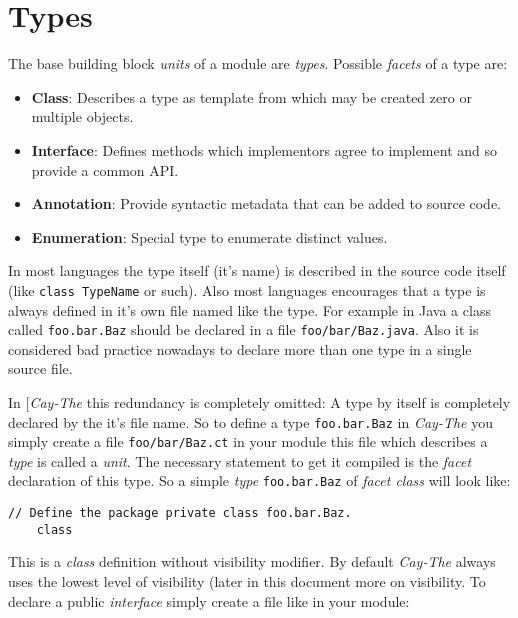 \documentclass[11pt,a4paper]{report}
\begin{document}
\section{Types}


The base building block \textit{units} of a module are \textit{types}. Possible \textit{facets} of a type are:

\begin{itemize}
    \item \textbf{Class}: Describes a type as template from which may be created zero or multiple objects.
    \item \textbf{Interface}: Defines methods which implementors agree to implement and so provide a common API.
    \item \textbf{Annotation}: Provide syntactic metadata that can be added to source code.
    \item \textbf{Enumeration}: Special type to enumerate distinct values.
\end{itemize}

In most languages the type itself (it's name) is described in the source code itself (like \texttt{class TypeName} or such). Also most languages encourages that a type is always defined in it's own file named like the type. For example in Java a class called \texttt{foo.bar.Baz} should be declared in a file \texttt{foo/bar/Baz.java}. Also it is considered bad practice nowadays to declare more than one type in a single source file.

In [\textit{Cay-The} this redundancy is completely omitted: A type by itself is completely declared by the it's file name. So to define a type \texttt{foo.bar.Baz} in \textit{Cay-The} you simply create a file \texttt{foo/bar/Baz.ct} in your module this file which describes a \textit{type} is called a \textit{unit}. The necessary statement to get it compiled is the \textit{facet} declaration of this type. So a simple \textit{type} \texttt{foo.bar.Baz} of \textit{facet class} will look like:

\begin{lstlisting}[language=CayThe, title=foo/bar.Baz.ct]
    // Define the package private class foo.bar.Baz.
    class
\end{lstlisting}

This is a \textit{class} definition without visibility modifier. By default \textit{Cay-The} always uses the lowest level of visibility (later in this document more on visibility. To declare a public \textit{interface} simply create a file like in your module:
\end{document}
